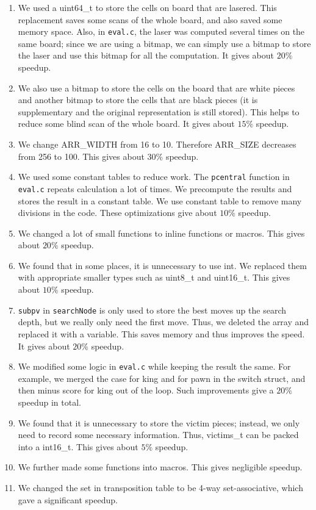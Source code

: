 \documentclass[10pt,twosidep]{article}
\begin{document}
\begin{enumerate}
  \item We used a uint64\_t to store the cells on board that are lasered. This replacement saves some scans of the whole board, and also saved some memory space. Also, in {\tt eval.c}, the laser was computed several times on the same board; since we are using a bitmap, we can simply use a bitmap to store the laser and use this bitmap for all the computation. It gives about $20\%$ speedup.
  \item We also use a bitmap to store the cells on the board that are white pieces and another bitmap to store the cells that are black pieces (it is supplementary and the original representation is still stored). This helps to reduce some blind scan of the whole board.  It gives about $15\%$ speedup.
  \item We change ARR\_WIDTH from 16 to 10. Therefore ARR\_SIZE decreases from 256 to 100. This gives about $30\%$ speedup.
  \item We used some constant tables to reduce work. 
  The {\tt pcentral} function in {\tt eval.c} repeats calculation a lot of times. We precompute the results and stores the result in a constant table.
  We use constant table to remove many divisions in the code.
  These optimizations give about $10\%$ speedup.
  \item We changed a lot of small functions to inline functions or macros. This gives about $20\%$ speedup.
  \item We found that in some places, it is unnecessary to use int. We replaced them with appropriate smaller types such as uint8\_t and uint16\_t. This gives about $10\%$ speedup.
  \item {\tt subpv} in {\tt searchNode} is only used to store the best moves up the search depth, but we really only need the first move. Thus, we deleted the array and replaced it with a variable. This saves memory and thus improves the speed. It gives about $20\%$ speedup.
  \item We modified some logic in {\tt eval.c} while keeping the result the same. For example, we merged the case for king and for pawn in the switch struct, and then minus score for king out of the loop. Such improvements give a $20\%$ speedup in total.
  \item We found that it is unnecessary to store the victim pieces; instead, we only need to record some necessary information. Thus, victims\_t can be packed into a int16\_t. This gives about $5\%$ speedup.
  \item We further made some functions into macros. This gives negligible speedup.
  \item We changed the set in transposition table to be 4-way set-associative, which gave a significant speedup. 
\end{enumerate}
\end{document}

